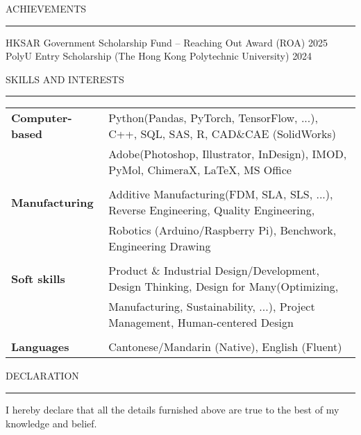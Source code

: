 \documentclass{resume} %
\renewenvironment{rSection}[1]{
\sectionskip
\textcolor{TsinghuaPurple}{\MakeUppercase{#1}}
\sectionlineskip
\hrule
\begin{list}{}{
\setlength{\leftmargin}{0em}
}
\item[]
}{
\end{list}
}
\begin{document}

\begin{rSection}{Achievements} \itemsep -2pt
{HKSAR Government Scholarship Fund -- Reaching Out Award (ROA)} \hfill {2025} \\
{PolyU Entry Scholarship (The Hong Kong Polytechnic University)} \hfill {2024}
\end{rSection}


\begin{rSection}{skills and INTERESTS}

\begin{tabular}{ @{} >{\bfseries}l @{\hspace{6ex}} l }  
Computer-based  & Python(Pandas, PyTorch, TensorFlow, ...), C++, SQL, SAS, R, CAD\&CAE (SolidWorks)\\
                & Adobe(Photoshop, Illustrator, InDesign), IMOD, PyMol, ChimeraX, LaTeX, MS Office\\
                \\
Manufacturing   & Additive Manufacturing(FDM, SLA, SLS, ...), Reverse Engineering, Quality Engineering,\\
                & Robotics (Arduino/Raspberry Pi), Benchwork, Engineering Drawing\\
                \\
Soft skills     & Product \& Industrial Design/Development, Design Thinking, Design for Many(Optimizing,\\
                & Manufacturing, Sustainability, ...), Project Management, Human-centered Design\\
                \\
Languages   & Cantonese/Mandarin (Native), English (Fluent)\\

\end{tabular}   

\end{rSection}



\begin{rSection}{ Declaration  } \itemsep -3pt        

\item I hereby declare that all the details furnished above are true to the best of my knowledge and belief.   
  
\end{rSection}
\end{document}
